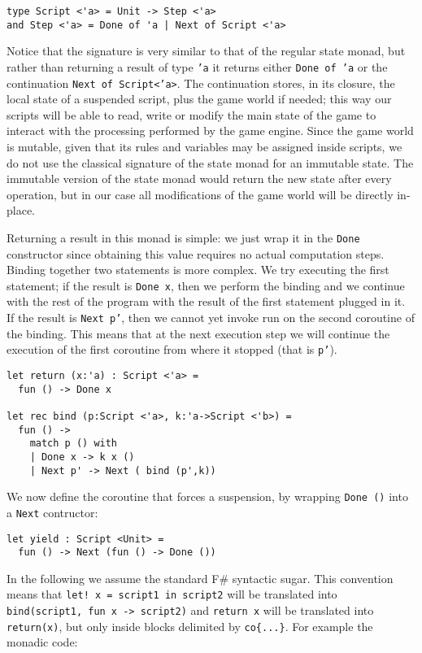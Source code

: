 \begin{lstlisting}
type Script <'a> = Unit -> Step <'a>
and Step <'a> = Done of 'a | Next of Script <'a>
\end{lstlisting}

Notice that the signature is very similar to that of the regular state monad, but rather than returning a result of type \texttt{'a} it returns either \texttt{Done of 'a} or the continuation \texttt{Next of Script<'a>}. The continuation stores, in its closure, the local state of a suspended script, plus the game world if needed; this way our scripts will be able to read, write or modify the main state of the game to interact with the processing performed by the game engine. Since the game world is mutable, given that its rules and variables may be assigned inside scripts, we do not use the classical signature of the state monad for an immutable state. The immutable version of the state monad would return the new state after every operation, but in our case all modifications of the game world will be directly in-place.

Returning a result in this monad is simple: we just wrap it in the \texttt{Done} constructor since obtaining this value requires no actual computation steps. Binding together two statements is more complex. We try executing the first statement;
if the result is \texttt{Done x}, then we perform the binding and we continue with the rest of the program with the result of the first statement plugged in it. If the result is \texttt{Next p'}, then we cannot yet invoke run on the second coroutine of the binding. This means that at the next execution step we will continue the execution of the first coroutine from where it stopped (that is \texttt{p'}).

\begin{lstlisting}
let return (x:'a) : Script <'a> = 
  fun () -> Done x

let rec bind (p:Script <'a>, k:'a->Script <'b>) =
  fun () ->
    match p () with
    | Done x -> k x ()
    | Next p' -> Next ( bind (p',k))
\end{lstlisting}

We now define the coroutine that forces a suspension, by wrapping \texttt{Done ()} into a \texttt{Next} contructor:

\begin{lstlisting}
let yield : Script <Unit> = 
  fun () -> Next (fun () -> Done ())
\end{lstlisting}

In the following we assume the standard F\# syntactic sugar. This convention means that \texttt{let! x = script1 in script2} will be translated into \texttt{bind(script1, fun x -> script2)} and \texttt{return x} will be translated into \texttt{return(x)}, but only inside blocks delimited by \texttt{co\{...\}}. For example the monadic code:

